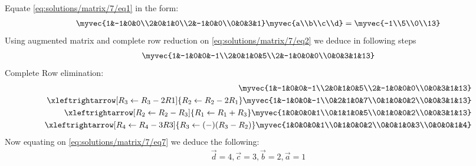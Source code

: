 Equate \eqref{eq:solutions/matrix/7/eq1} in the form:
\begin{align}
\label{eq:solutions/matrix/7/eq2}
\myvec{1&-1&0&0\\2&0&1&0\\2&-1&0&0\\0&0&3&1}
\myvec{a\\b\\c\\d}=
\myvec{-1\\5\\0\\13}
\end{align}
Using augmented matrix and complete row reduction on \eqref{eq:solutions/matrix/7/eq2} we deduce in following steps
\begin{align}
\myvec{1&-1&0&0&-1\\2&0&1&0&5\\2&-1&0&0&0\\0&0&3&1&13}
\end{align}
Complete Row elimination:
\begin{align}
\myvec{1&-1&0&0&-1\\2&0&1&0&5\\2&-1&0&0&0\\0&0&3&1&13}\\
    \xleftrightarrow[R_3\leftarrow R_3-2R1]{R_2 \leftarrow R_2-2R_1}
	\myvec{1&-1&0&0&-1\\0&2&1&0&7\\0&1&0&0&2\\0&0&3&1&13}\\
	\xleftrightarrow[R_2\leftarrow R_2-R_3]{R_1 \leftarrow R_1+R_3}
    \label{eq:solutions/matrix/7/eq6}
	\myvec{1&0&0&0&1\\0&1&1&0&5\\0&1&0&0&2\\0&0&3&1&13}\\
	\label{eq:solutions/matrix/7/eq7}
	 \xleftrightarrow[R_4\leftarrow R_4-3R3]{R_3 \leftarrow (-)(R_3-R_2)}
	\myvec{1&0&0&0&1\\0&1&0&0&2\\0&0&1&0&3\\0&0&0&1&4}
\end{align}
Now equating on \eqref{eq:solutions/matrix/7/eq7} we deduce the following:
\begin{align}
\vec{d}=4,
\vec{c}=3,
\vec{b}=2,
\vec{a}=1
\end{align}
